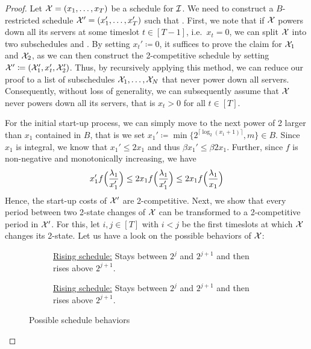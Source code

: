 \begin{proof}
Let $\mathcal{X}=(x_1,\dotsc,x_T)$ be a schedule for $\mathcal{I}$. We need to construct a $B$-restricted schedule $\mathcal{X}'=(x_1',\dotsc,x_T')$ such that .
First, we note that if $\mathcal{X}$ powers down all its servers at some timeslot $t\in[T-1]$, i.e.\ $x_t=0$, we can split $\mathcal{X}$ into two subschedules  and . By setting $x_t'\coloneqq0$, it suffices to prove the claim for $\mathcal{X}_1$ and $\mathcal{X}_2$, as we can then construct the 2-competitive schedule by setting $\mathcal{X}'\coloneqq(\mathcal{X}_1',x_t',\mathcal{X}_2')$. Thus, by recursively applying this method, we can reduce our proof to a list of subschedules $\mathcal{X}_1,\dotsc,\mathcal{X}_N$ that never power down all servers. Consequently, without loss of generality, we can subsequently assume that $\mathcal{X}$ never powers down all its servers, that is $x_t>0$ for all $t\in[T]$. 
	
For the initial start-up process, we can simply move to the next power of 2 larger than $x_1$ contained in $B$, that is we set $x_1'\coloneqq\min\{2^{\lceil\log_2(x_1+1)\rceil},m\}\in B$. Since $x_1$ is integral, we know that $x_1'\le2x_1$ and thus $\beta x_1'\le\beta 2x_1$. Further, since $f$ is non-negative and monotonically increasing, we have
\begin{equation*}
	x_1'f\Bigl(\frac{\lambda_1}{x_1'}\Bigr)\le2x_1f\Bigl(\frac{\lambda_1}{x_1'}\Bigr)\le2x_1f\Bigl(\frac{\lambda_1}{x_1}\Bigr)
\end{equation*}
Hence, the start-up costs of $\mathcal{X}'$ are 2-competitive. Next, we show that every period between two 2-state changes of $\mathcal{X}$ can be transformed to a 2-competitive period in $\mathcal{X}'$. For this, let $i,j\in[T]$ with $i<j$ be the first timeslots at which $\mathcal{X}$ changes its 2-state. Let us have a look on the possible behaviors of $\mathcal{X}$:
\begin{figure}[H]
\captionsetup[subfigure]{labelformat=empty}
\begin{subfigure}[b]{0.47\textwidth}
	
\caption{\underline{Rising schedule:} Stays between $2^j$ and $2^{j+1}$ and then rises above $2^{j+1}$.}
\end{subfigure}
\hfill
\begin{subfigure}[b]{0.47\textwidth}
	
\caption{\underline{Rising schedule:} Stays between $2^j$ and $2^{j+1}$ and then rises above $2^{j+1}$.}
\end{subfigure}
\caption{Possible schedule behaviors}
\end{figure}


\end{proof}
